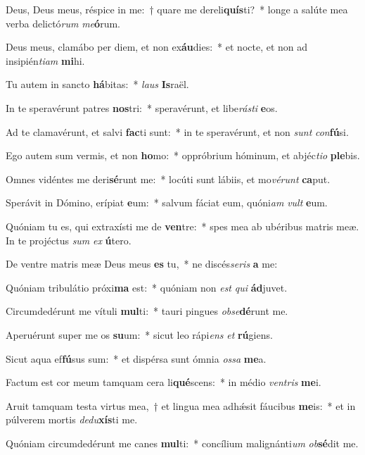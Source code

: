 \item Deus, Deus meus, réspice in me:~† quare me dereli\textbf{quís}ti?~* longe a salúte mea verba delictó\textit{rum} \textit{me}\textbf{ó}rum.
\item Deus meus, clamábo per diem, et non ex\textbf{áu}dies:~* et nocte, et non ad insipién\textit{ti}\textit{am} \textbf{mi}hi.
\item Tu autem in sancto \textbf{há}bitas:~* \textit{laus} \textbf{Is}raël.
\item In te speravérunt patres \textbf{nos}tri:~* speravérunt, et libe\textit{rás}\textit{ti} \textbf{e}os.
\item Ad te clamavérunt, et salvi \textbf{fac}ti sunt:~* in te speravérunt, et non \textit{sunt} \textit{con}\textbf{fú}si.
\item Ego autem sum vermis, et non \textbf{ho}mo:~* oppróbrium hóminum, et abjéc\textit{ti}\textit{o} \textbf{ple}bis.
\item Omnes vidéntes me deri\textbf{sé}runt me:~* locúti sunt lábiis, et mo\textit{vé}\textit{runt} \textbf{ca}put.
\item Sperávit in Dómino, erípiat \textbf{e}um:~* salvum fáciat eum, quóni\textit{am} \textit{vult} \textbf{e}um.
\item Quóniam tu es, qui extraxísti me de \textbf{ven}tre:~* spes mea ab ubéribus matris meæ. In te projéctus \textit{sum} \textit{ex} \textbf{ú}tero.
\item De ventre matris meæ Deus meus \textbf{es} tu,~* ne discés\textit{se}\textit{ris} \textbf{a} me:
\item Quóniam tribulátio próxi\textbf{ma} est:~* quóniam non \textit{est} \textit{qui} \textbf{ád}juvet.
\item Circumdedérunt me vítuli \textbf{mul}ti:~* tauri pingues \textit{ob}\textit{se}\textbf{dé}runt me.
\item Aperuérunt super me os \textbf{su}um:~* sicut leo rápi\textit{ens} \textit{et} \textbf{rú}giens.
\item Sicut aqua ef\textbf{fú}sus sum:~* et dispérsa sunt ómnia \textit{os}\textit{sa} \textbf{me}a.
\item Factum est cor meum tamquam cera li\textbf{qué}scens:~* in médio \textit{ven}\textit{tris} \textbf{me}i.
\item Aruit tamquam testa virtus mea,~† et lingua mea adhǽsit fáucibus \textbf{me}is:~* et in púlverem mortis \textit{de}\textit{du}\textbf{xís}ti me.
\item Quóniam circumdedérunt me canes \textbf{mul}ti:~* concílium malignánti\textit{um} \textit{ob}\textbf{sé}dit me.
